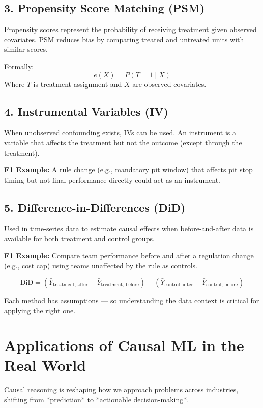 \documentclass[12pt]{book}
\begin{document}
\subsection*{3. Propensity Score Matching (PSM)}

Propensity scores represent the probability of receiving treatment given observed covariates. PSM reduces bias by comparing treated and untreated units with similar scores.

Formally:
\[
e(X) = P(T = 1 \mid X)
\]
Where \( T \) is treatment assignment and \( X \) are observed covariates.

\subsection*{4. Instrumental Variables (IV)}

When unobserved confounding exists, IVs can be used. An instrument is a variable that affects the treatment but not the outcome (except through the treatment).

\textbf{F1 Example:} A rule change (e.g., mandatory pit window) that affects pit stop timing but not final performance directly could act as an instrument.

\subsection*{5. Difference-in-Differences (DiD)}

Used in time-series data to estimate causal effects when before-and-after data is available for both treatment and control groups.

\textbf{F1 Example:} Compare team performance before and after a regulation change (e.g., cost cap) using teams unaffected by the rule as controls.

\[
\text{DiD} = (\bar{Y}_{\text{treatment, after}} - \bar{Y}_{\text{treatment, before}}) - (\bar{Y}_{\text{control, after}} - \bar{Y}_{\text{control, before}})
\]

Each method has assumptions — so understanding the data context is critical for applying the right one.

\section{Applications of Causal ML in the Real World}

Causal reasoning is reshaping how we approach problems across industries, shifting from *prediction* to *actionable decision-making*.
\end{document}
